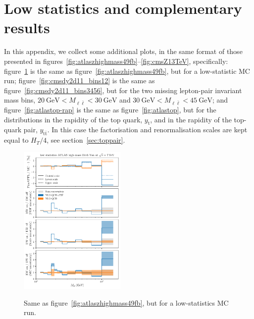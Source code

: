 \section{Low statistics and complementary results}
\label{app:add_plots}

In this appendix, we collect some additional plots, in the same format of those
presented in figures~\ref{fig:atlaszhighmass49fb}--\ref{fig:cmsZ13TeV},
specifically: figure~\ref{fig:atlaszhighmass49fb-lowstat} is the same as
figure~\ref{fig:atlaszhighmass49fb}, but for a low-statistic MC run;
figure~\ref{fig:cmsdy2d11_bins12} is the same as
figure~\ref{fig:cmsdy2d11_bins3456}, but for the two missing lepton-pair
invariant mass bins,
$\SI{20}{\giga\electronvolt}<M_{\ell\bar\ell}<\SI{30}{\giga\electronvolt}$ and
$\SI{30}{\giga\electronvolt}<M_{\ell\bar\ell}<\SI{45}{\giga\electronvolt}$;
and figure~\ref{fig:atlastop-rap} is the same as figure~\ref{fig:atlastop},
but for the distributions in the rapidity of the top quark, $y_{\mathrm{t}}$,
and in the rapidity of the top-quark pair, $y_{\mathrm{t}\bar{\mathrm{t}}}$. In this
case the factorisation and renormalisation scales are kept equal to
$H_T/4$, see section~\ref{sec:toppair}.

\begin{figure}[!t]
    \centering
    \includegraphics[width=0.46\textwidth]{figures/pineappl_ATLASZHIGHMASS49FB_lowstat}\\
    \caption{Same as figure~\ref{fig:atlaszhighmass49fb}, but for a
    low-statistics MC run.}
    \label{fig:atlaszhighmass49fb-lowstat}
\end{figure}

